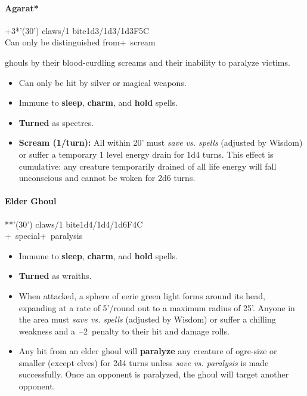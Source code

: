 \documentclass[english,11pt,openany,letterpaper,twocolumn]{book}
\begin{document}
\skipline

\hypertarget{agarat}{}
\paragraph{Agarat*}
+3*'(30') claws/1 bite\tab 1d3/1d3/1d3\tab F5\tab C
\\Can only be distinguished from+~scream

ghouls by their blood-curdling screams and their inability to paralyze victims.
\begin{itemize}[leftmargin=*,label=\itshape\textbullet]
\item
Can only be hit by silver or magical weapons.
\item
Immune to \textbf{sleep}, \textbf{charm}, and \textbf{hold} spells.
\item
\textbf{Turned} as spectres.
\item
\textbf{Scream (1/turn):} All within 20' must \emph{save vs. spells} (adjusted by Wisdom) or suffer a temporary 1 level energy drain for 1d4 turns. This effect is cumulative: any creature temporarily drained of all life energy will fall unconscious and cannot be woken for 2d6 turns.
\end{itemize}


\skipline
\hypertarget{elder-ghoul}{}
\paragraph{Elder Ghoul}
**'(30') claws/1 bite\tab 1d4/1d4/1d6\tab F4\tab C
\\+~special\tab +~paralysis

\begin{itemize}[leftmargin=*,label=\itshape\textbullet]
\item
Immune to \textbf{sleep}, \textbf{charm}, and \textbf{hold} spells.
\item
\textbf{Turned} as wraiths.
\item
When attacked, a sphere of eerie green light forms around its head, expanding at a rate of 5'/round out to a maximum radius of 25'. Anyone in the area must \emph{save vs. spells} (adjusted by Wisdom) or suffer a chilling weakness and a~--2~penalty to their hit and damage rolls.
\item
Any hit from an elder ghoul will \textbf{paralyze} any creature of ogre-size or smaller (except elves) for 2d4 turns unless \emph{save vs. paralysis} is made successfully. Once an opponent is paralyzed, the ghoul will target another opponent.
\end{itemize}
\end{document}
